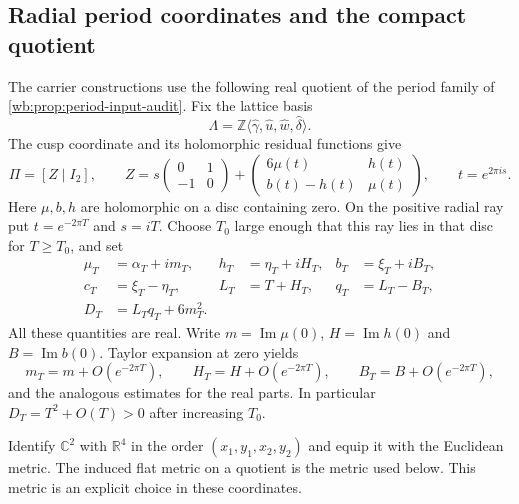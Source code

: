 \subsection{Radial period coordinates and the compact quotient}
\label{mapsIII:carrier-radial-prerequisites}

The carrier constructions use the following real quotient of the period
family of \cref{wb:prop:period-input-audit}.  Fix the lattice basis
\[
 \Lambda=\mathbb Z\langle\widehat\gamma,\widehat u,
                         \widehat w,\widehat\delta\rangle.
\]
The cusp coordinate and its holomorphic residual functions give
\[
 \Pi=[Z\mid I_2],\qquad
 Z=s\begin{pmatrix}0&1\\-1&0\end{pmatrix}
       +\begin{pmatrix}6\mu(t)&h(t)\\b(t)-h(t)&\mu(t)\end{pmatrix},
 \qquad t=e^{2\pi i s}.
\]
Here $\mu,b,h$ are holomorphic on a disc containing zero.  On the positive
radial ray put $t=e^{-2\pi T}$ and $s=iT$.  Choose $T_0$ large enough that
this ray lies in that disc for $T\geq T_0$, and set
\begin{equation}
 \begin{aligned}
 \mu_T&=\alpha_T+im_T,& h_T&=\eta_T+iH_T,& b_T&=\xi_T+iB_T,\\
 c_T&=\xi_T-\eta_T,& L_T&=T+H_T,& q_T&=L_T-B_T,\\
 D_T&=L_Tq_T+6m_T^2.
 \end{aligned}
 \label{wb:cusp-spec-radial-notation}
\end{equation}
All these quantities are real.  Write
$m=\operatorname{Im}\mu(0)$, $H=\operatorname{Im}h(0)$ and
$B=\operatorname{Im}b(0)$.  Taylor expansion at zero yields
\begin{equation}
 m_T=m+O(e^{-2\pi T}),\qquad
 H_T=H+O(e^{-2\pi T}),\qquad
 B_T=B+O(e^{-2\pi T}),
 \label{wb:cusp-spec-holomorphic-errors}
\end{equation}
and the analogous estimates for the real parts.  In particular
$D_T=T^2+O(T)>0$ after increasing $T_0$.

Identify $\mathbb C^2$ with $\mathbb R^4$ in the order
$(x_1,y_1,x_2,y_2)$ and equip it with the Euclidean metric.  The induced
flat metric on a quotient is the metric used below.  This metric is an
explicit choice in these coordinates.

